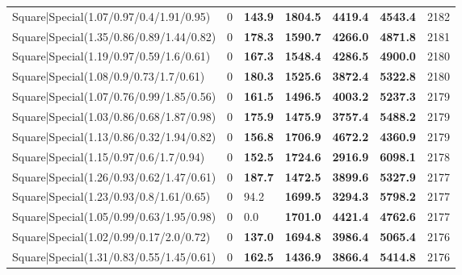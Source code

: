 \begin{tabular}{lrllllr}
 Square|Special(1.07/0.97/0.4/1.91/0.95)                       &             0   & \textbf{143.9} & \textbf{1804.5} & \textbf{4419.4} & \textbf{4543.4} &         2182 \\
 Square|Special(1.35/0.86/0.89/1.44/0.82)                      &             0   & \textbf{178.3} & \textbf{1590.7} & \textbf{4266.0} & \textbf{4871.8} &         2181 \\
 Square|Special(1.19/0.97/0.59/1.6/0.61)                       &             0   & \textbf{167.3} & \textbf{1548.4} & \textbf{4286.5} & \textbf{4900.0} &         2180 \\
 Square|Special(1.08/0.9/0.73/1.7/0.61)                        &             0   & \textbf{180.3} & \textbf{1525.6} & \textbf{3872.4} & \textbf{5322.8} &         2180 \\
 Square|Special(1.07/0.76/0.99/1.85/0.56)                      &             0   & \textbf{161.5} & \textbf{1496.5} & \textbf{4003.2} & \textbf{5237.3} &         2179 \\
 Square|Special(1.03/0.86/0.68/1.87/0.98)                      &             0   & \textbf{175.9} & \textbf{1475.9} & \textbf{3757.4} & \textbf{5488.2} &         2179 \\
 Square|Special(1.13/0.86/0.32/1.94/0.82)                      &             0   & \textbf{156.8} & \textbf{1706.9} & \textbf{4672.2} & \textbf{4360.9} &         2179 \\
 Square|Special(1.15/0.97/0.6/1.7/0.94)                        &             0   & \textbf{152.5} & \textbf{1724.6} & \textbf{2916.9} & \textbf{6098.1} &         2178 \\
 Square|Special(1.26/0.93/0.62/1.47/0.61)                      &             0   & \textbf{187.7} & \textbf{1472.5} & \textbf{3899.6} & \textbf{5327.9} &         2177 \\
 Square|Special(1.23/0.93/0.8/1.61/0.65)                       &             0   & 94.2           & \textbf{1699.5} & \textbf{3294.3} & \textbf{5798.2} &         2177 \\
 Square|Special(1.05/0.99/0.63/1.95/0.98)                      &             0   & 0.0            & \textbf{1701.0} & \textbf{4421.4} & \textbf{4762.6} &         2177 \\
 Square|Special(1.02/0.99/0.17/2.0/0.72)                       &             0   & \textbf{137.0} & \textbf{1694.8} & \textbf{3986.4} & \textbf{5065.4} &         2176 \\
 Square|Special(1.31/0.83/0.55/1.45/0.61)                      &             0   & \textbf{162.5} & \textbf{1436.9} & \textbf{3866.4} & \textbf{5414.8} &         2176 \\

\end{tabular}
